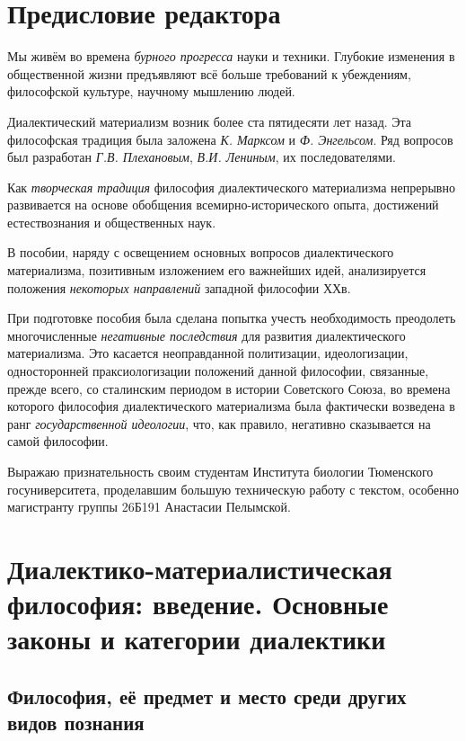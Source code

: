 \documentclass[a4paper,14pt,russian]{extreport}
\begin{document}
\newpage

\chapter{Предисловие редактора}

Мы живём во времена \emph{бурного прогресса} науки и техники. Глубокие изменения в общественной жизни предъявляют всё больше требований к убеждениям, философской культуре, научному мышлению людей.

Диалектический материализм возник более ста пятидесяти лет назад. Эта философская традиция была заложена \emph{К. Марксом} и \emph{Ф. Энгельсом}. Ряд вопросов был разработан \emph{Г.В. Плехановым}, \emph{В.И. Лениным}, их последователями.

Как \emph{творческая традиция} философия диалектического материализма непрерывно развивается на основе обобщения всемирно-исторического опыта, достижений естествознания и общественных наук.

В пособии, наряду с освещением основных вопросов диалектического материализма, позитивным изложением его важнейших идей, анализируется положения \emph{некоторых направлений} западной философии ХХв.

При подготовке пособия была сделана попытка учесть необходимость преодолеть многочисленные \emph{негативные последствия} для развития диалектического материализма. Это касается неоправданной политизации, идеологизации, односторонней праксиологизации положений данной философии, связанные, прежде всего, со сталинским периодом в истории Советского Союза, во времена которого философия диалектического материализма была фактически возведена в ранг \emph{государственной идеологии}, что, как правило, негативно сказывается на самой философии.

Выражаю признательность своим студентам Института биологии Тюменского госуниверситета, проделавшим большую техническую работу с текстом, особенно магистранту группы 26Б191 Анастасии Пелымской.

\chapter{Диалектико-материалистическая философия: введение. Основные законы и категории диалектики}

\section{Философия, её предмет и место среди других видов познания}
\end{document}
